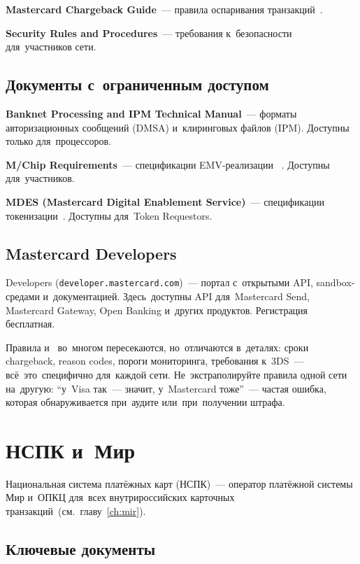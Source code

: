 \textbf{Mastercard Chargeback Guide}~--- правила оспаривания
транзакций~.

\textbf{Security Rules and Procedures}~--- требования
к~безопасности для~участников сети.

\subsection*{Документы с~ограниченным доступом}

\textbf{Banknet Processing and IPM Technical Manual}~---
форматы авторизационных сообщений (DMSA) и~клиринговых
файлов (IPM). Доступны только для~процессоров.

\textbf{M/Chip Requirements}~--- спецификации EMV-реализации
~. Доступны
для~участников.

\textbf{MDES (Mastercard Digital Enablement Service)}~---
спецификации токенизации~. Доступны
для~Token Requestors.

\subsection*{Mastercard Developers}

 Developers
(\texttt{developer.mastercard.com})~--- портал
с~открытыми API, sandbox-средами и~документацией.
Здесь~доступны API для~Mastercard Send, Mastercard
Gateway, Open Banking и~других продуктов. Регистрация
бесплатная.

\begin{practice}
  Правила  и~ во~многом
  пересекаются, но~отличаются в~деталях: сроки chargeback,
  reason codes, пороги мониторинга, требования к~3DS~---
  всё~это~специфично для~каждой сети. Не~экстраполируйте
  правила одной сети на~другую: \enquote{у~Visa так~---
    значит, у~Mastercard тоже}~--- частая ошибка, которая
  обнаруживается при~аудите или~при~получении штрафа.
\end{practice}


\section{НСПК и~Мир}
\label{sec:ps-nspk}

Национальная система платёжных карт (НСПК)~---
оператор платёжной системы Мир и~ОПКЦ для~всех
внутрироссийских карточных
транзакций~(см.~главу~\ref{ch:mir}).

\subsection*{Ключевые документы}

